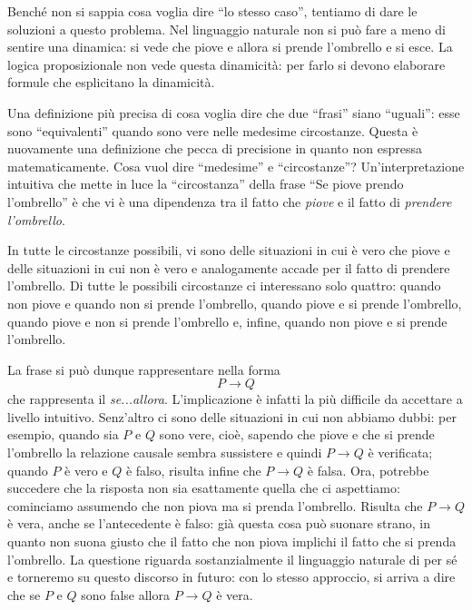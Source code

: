 Benché non si sappia cosa voglia dire ``lo stesso caso'', tentiamo di dare le soluzioni 
a questo problema. Nel linguaggio naturale non si può fare a meno di sentire 
una dinamica: si vede che piove e allora si prende l'ombrello e si esce. La logica 
proposizionale non vede questa dinamicità: per farlo si devono elaborare formule 
che esplicitano la dinamicità.

Una definizione più precisa di cosa voglia dire 
che due ``frasi'' siano ``uguali'': esse sono ``equivalenti'' quando sono 
vere nelle medesime circostanze. Questa è nuovamente una definizione che pecca 
di precisione in quanto non espressa matematicamente. Cosa vuol dire ``medesime'' 
e ``circostanze''? Un'interpretazione intuitiva che mette in luce la 
``circostanza'' della frase ``Se piove prendo l'ombrello'' è che vi è una dipendenza tra il fatto che \textit{piove} e il fatto di \textit{prendere l'ombrello}. 

In tutte le circostanze possibili, vi sono delle situazioni in cui 
è vero che piove e delle situazioni in cui non è vero e analogamente 
accade per il fatto di prendere l'ombrello. 
Di tutte le possibili circostanze ci interessano 
solo quattro: quando non piove e quando non si prende l'ombrello, quando piove 
e si prende l'ombrello, quando piove e non si prende l'ombrello e, infine, 
quando non piove e si prende l'ombrello. 
 
La frase si può dunque rappresentare nella forma 
$$
P \rightarrow Q
$$
che rappresenta il \textit{se...allora}. L'implicazione è infatti la più 
difficile da accettare a livello intuitivo. Senz'altro ci sono delle situazioni 
in cui non abbiamo dubbi: per esempio, quando sia $P$ e $Q$ sono vere, cioè, 
sapendo che piove e che si prende l'ombrello la relazione causale sembra sussistere 
e quindi $P \rightarrow Q$ è verificata; quando $P$ è vero e $Q$ è falso,
risulta infine che $P \rightarrow Q$ è falsa. Ora, potrebbe succedere che 
la risposta non sia esattamente quella che ci aspettiamo: cominciamo assumendo 
che non piova ma si prenda l'ombrello. Risulta che $P \rightarrow Q$ è vera, 
anche se l'antecedente è falso: già questa cosa può suonare strano, in quanto 
non suona giusto che il fatto che non piova implichi il fatto che si prenda l'ombrello. 
La questione riguarda sostanzialmente il linguaggio naturale di per sé e torneremo 
su questo discorso in futuro: con lo stesso approccio, si arriva a dire che se 
$P$ e $Q$ sono false allora $P \rightarrow Q$ è vera. 

